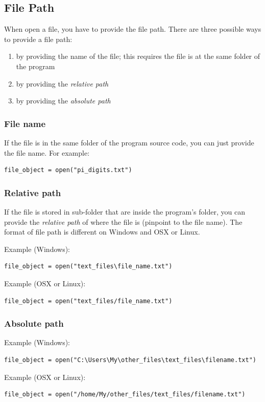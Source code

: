 \documentclass[12pt]{book}
\begin{document}
\subsection{File Path}
\label{sec:orgbb11495}
When open a file, you have to provide the file path. There are three possible ways to provide a file path:
\begin{enumerate}
\item by providing the name of the file; this requires the file is at the same folder of the program
\item by providing the \emph{relative path}
\item by providing the \emph{absolute path}
\end{enumerate}
\subsubsection{File name}
\label{sec:org3d6f8b8}
If the file is in the same folder of the program source code, you can just provide the file name. For example:
\begin{verbatim}
file_object = open("pi_digits.txt")
\end{verbatim}
\subsubsection{Relative path}
\label{sec:org9cc1d3c}
If the file is stored in sub-folder that are inside the program's folder, you can provide the \emph{relative path} of where the file is (pinpoint to the file name). The format of file path is different on Windows and OSX or Linux.

Example (Windows):
\begin{verbatim}
file_object = open("text_files\file_name.txt")
\end{verbatim}
Example (OSX or Linux):
\begin{verbatim}
file_object = open("text_files/file_name.txt")
\end{verbatim}
\subsubsection{Absolute path}
\label{sec:org6668c57}
Example (Windows):
\begin{verbatim}
file_object = open("C:\Users\My\other_files\text_files\filename.txt")
\end{verbatim}
Example (OSX or Linux):
\begin{verbatim}
file_object = open("/home/My/other_files/text_files/filename.txt")
\end{verbatim}
\end{document}
